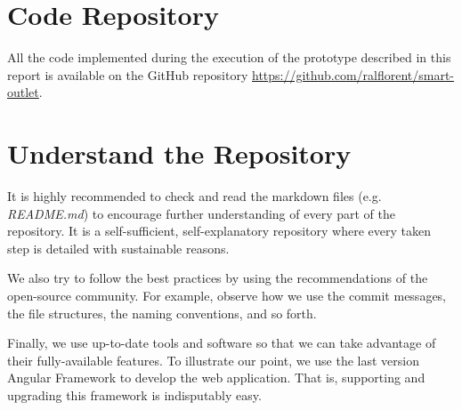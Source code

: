 %
%
%
%


\clearpage
\appendix
\begin{appendices}
    \section{Code Repository}
    \label{sec:code-repo}

    All the code implemented during the execution of the prototype described in this report is available on the GitHub repository \href{https://github.com/ralflorent/smart-outlet}{https://github.com/ralflorent/smart-outlet}.

    \section{Understand the Repository}
    It is highly recommended to check and read the markdown files (e.g. \emph{README.md}) to encourage further understanding of every part of the repository. It is a self-sufficient, self-explanatory repository where every taken step is detailed with sustainable reasons.

    We also try to follow the best practices by using the recommendations of the open-source community. For example, observe how we use the commit messages, the file structures, the naming conventions, and so forth.

    Finally, we use up-to-date tools and software so that we can take advantage of their fully-available features. To illustrate our point, we use the last version Angular Framework to develop the web application. That is, supporting and upgrading this framework is indisputably easy.

\end{appendices}
